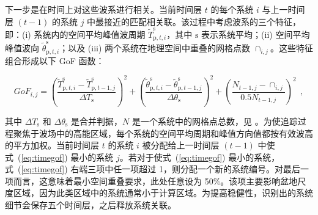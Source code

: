 下一步是在时间上对这些波系进行相关。当前时间层 $t$ 的每个系统 $i$ 与上一时间层 $(t-1)$ 的系统 $j$ 中最接近的匹配相关联。该过程中考虑波系的三个特征，即：(i) 系统内的空间平均峰值波周期 $\tilde{T}^\mathrm{s}_{\mathrm{p},t,i}$，其中
$\mathrm{s}$ 表示系统平均；(ii) 空间平均峰值波向
$\tilde{\theta}^\mathrm{s}_{\mathrm{p},t,i}$；以及 (iii) 两个系统在地理空间中重叠的网格点数 $\cap_{i,j}$。这些特征组合形成以下 GoF 函数：

\begin{equation}
    GoF_{i,j} = {\left( \frac{\tilde{T}^\mathrm{s}_{\mathrm{p},t,i} - \tilde{T}^\mathrm{s}_{\mathrm{p},t-1,j}}{\Delta T_\mathrm{s}} \right)}^2 + 
                       {\left( \frac{\tilde{\theta}^\mathrm{s}_{\mathrm{p},t,i} - \tilde{\theta}^\mathrm{s}_{\mathrm{p},t-1,j}}{\Delta\theta_\mathrm{s}} \right)}^2 +
                       {\left( \frac{N_{t-1,j} - \cap_{i,j}}{0.5N_{t-1,j}} \right)}^2\ \ ,
\label{eq:timegof}
\end{equation} 

\noindent
其中 $\Delta T_\mathrm{s}$ 和 $\Delta\theta_\mathrm{s}$ 是合并判据，$N$ 是一个系统中的网格点总数，见 \cite{art:WHD13}。为使追踪过程聚焦于波场中的高能区域，每个系统的空间平均周期和峰值方向值都按有效波高的平方加权。当前时间层 $t$ 的系统 $i$ 被分配给上一时间层 $(t-1)$ 中使式~(\ref{eq:timegof}) 最小的系统 $j$。若对于使式~(\ref{eq:timegof}) 最小的系统，式~(\ref{eq:timegof}) 右端三项中任一项超过 1，则分配一个新的系统编号。对最后一项而言，这意味着最小空间重叠要求，此处任意设为 50\%。该项主要影响盆地尺度区域，因为此类区域中的系统通常小于计算区域。为提高稳健性，识别出的系统细节会保存五个时间层，之后释放系统关联。
